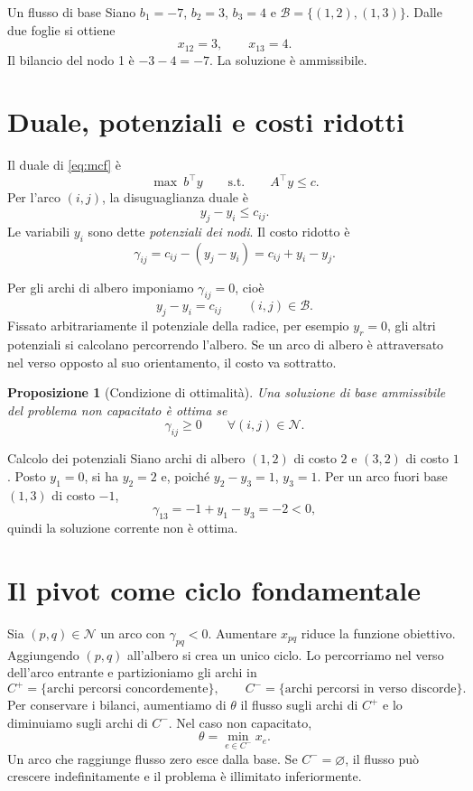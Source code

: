 \documentclass[11pt,a4paper]{article}
\newtheorem{proposition}[definition]{Proposizione}
\newcommand{\Bset}{\mathcal{B}}
\newcommand{\Nset}{\mathcal{N}}
\begin{document}
\begin{examplebox}{Un flusso di base}
Siano $b_1=-7$, $b_2=3$, $b_3=4$ e $\Bset=\{(1,2),(1,3)\}$. Dalle due foglie si ottiene
\[
x_{12}=3,\qquad x_{13}=4.
\]
Il bilancio del nodo 1 è $-3-4=-7$. La soluzione è ammissibile.
\end{examplebox}

\section{Duale, potenziali e costi ridotti}

Il duale di \eqref{eq:mcf} è
\[
\max\ b^\top y\qquad\text{s.t.}\qquad A^\top y\leq c.
\]
Per l'arco $(i,j)$, la disuguaglianza duale è
\[
y_j-y_i\leq c_{ij}.
\]
Le variabili $y_i$ sono dette \emph{potenziali dei nodi}. Il costo ridotto è
\begin{equation}\label{eq:ridotto}
\gamma_{ij}=c_{ij}-(y_j-y_i)=c_{ij}+y_i-y_j.
\end{equation}

Per gli archi di albero imponiamo $\gamma_{ij}=0$, cioè
\[
y_j-y_i=c_{ij}\qquad (i,j)\in\Bset.
\]
Fissato arbitrariamente il potenziale della radice, per esempio $y_r=0$, gli altri potenziali si calcolano percorrendo l'albero. Se un arco di albero è attraversato nel verso opposto al suo orientamento, il costo va sottratto.

\begin{proposition}[Condizione di ottimalità]
Una soluzione di base ammissibile del problema non capacitato è ottima se
\[
\gamma_{ij}\geq0\qquad\forall(i,j)\in\Nset.
\]
\end{proposition}

\begin{examplebox}{Calcolo dei potenziali}
Siano archi di albero $(1,2)$ di costo $2$ e $(3,2)$ di costo $1$. Posto $y_1=0$, si ha $y_2=2$ e, poiché $y_2-y_3=1$, $y_3=1$. Per un arco fuori base $(1,3)$ di costo $-1$,
\[
\gamma_{13}=-1+y_1-y_3=-2<0,
\]
quindi la soluzione corrente non è ottima.
\end{examplebox}

\section{Il pivot come ciclo fondamentale}

Sia $(p,q)\in\Nset$ un arco con $\gamma_{pq}<0$. Aumentare $x_{pq}$ riduce la funzione obiettivo. Aggiungendo $(p,q)$ all'albero si crea un unico ciclo. Lo percorriamo nel verso dell'arco entrante e partizioniamo gli archi in
\[
C^+=\{\text{archi percorsi concordemente}\},\qquad
C^-=\{\text{archi percorsi in verso discorde}\}.
\]
Per conservare i bilanci, aumentiamo di $\theta$ il flusso sugli archi di $C^+$ e lo diminuiamo sugli archi di $C^-$. Nel caso non capacitato,
\[
\theta=\min_{e\in C^-}x_e.
\]
Un arco che raggiunge flusso zero esce dalla base. Se $C^-=\varnothing$, il flusso può crescere indefinitamente e il problema è illimitato inferiormente.
\end{document}
